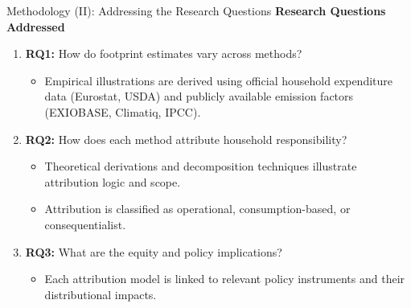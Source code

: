 \documentclass{beamer}
\begin{document}
\begin{frame}{Methodology (II): Addressing the Research Questions}
\vspace{-2.5em}
    \small
\textbf{Research Questions Addressed}
\small
\begin{enumerate}[$\Rightarrow$]
  \item \textbf{RQ1:} How do footprint estimates vary across methods?
  \begin{itemize}
    \item Empirical illustrations are derived using official household expenditure data (Eurostat, USDA) and publicly available emission factors (EXIOBASE, Climatiq, IPCC).
  \end{itemize}
  \item \textbf{RQ2:} How does each method attribute household responsibility?
  \begin{itemize}
    \item Theoretical derivations and decomposition techniques illustrate attribution logic and scope.
    \item Attribution is classified as operational, consumption-based, or consequentialist.
  \end{itemize}
  \item \textbf{RQ3:} What are the equity and policy implications?
  \begin{itemize}
    \item Each attribution model is linked to relevant policy instruments and their distributional impacts.
  \end{itemize}
\end{enumerate}
\end{frame}
\end{document}

